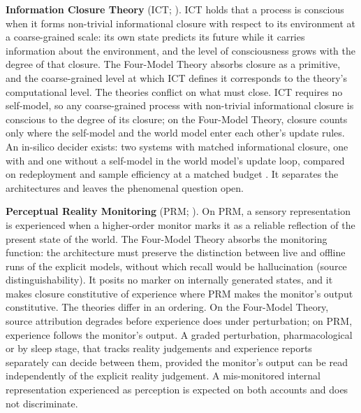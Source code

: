 \documentclass[12pt]{article}
\begin{document}
\textbf{Information Closure Theory} (ICT; \citealp{Chang2020}). ICT holds that a process is conscious when it forms non-trivial informational closure with respect to its environment at a coarse-grained scale: its own state predicts its future while it carries information about the environment, and the level of consciousness grows with the degree of that closure. The Four-Model Theory absorbs closure as a primitive, and the coarse-grained level at which ICT defines it corresponds to the theory's computational level. The theories conflict on what must close. ICT requires no self-model, so any coarse-grained process with non-trivial informational closure is conscious to the degree of its closure; on the Four-Model Theory, closure counts only where the self-model and the world model enter each other's update rules. An in-silico decider exists: two systems with matched informational closure, one with and one without a self-model in the world model's update loop, compared on redeployment and sample efficiency at a matched budget \citep{Gruber2026d}. It separates the architectures and leaves the phenomenal question open.

\textbf{Perceptual Reality Monitoring} (PRM; \citealp{Lau2022}). On PRM, a sensory representation is experienced when a higher-order monitor marks it as a reliable reflection of the present state of the world. The Four-Model Theory absorbs the monitoring function: the architecture must preserve the distinction between live and offline runs of the explicit models, without which recall would be hallucination (source distinguishability). It posits no marker on internally generated states, and it makes closure constitutive of experience where PRM makes the monitor's output constitutive. The theories differ in an ordering. On the Four-Model Theory, source attribution degrades before experience does under perturbation; on PRM, experience follows the monitor's output. A graded perturbation, pharmacological or by sleep stage, that tracks reality judgements and experience reports separately can decide between them, provided the monitor's output can be read independently of the explicit reality judgement. A mis-monitored internal representation experienced as perception is expected on both accounts and does not discriminate.
\end{document}
